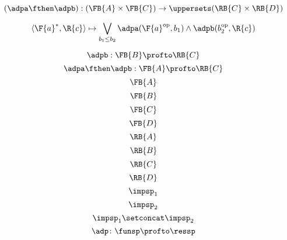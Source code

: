 {\begin{forslides}
        \begin{equation}
            \label{eq:adpM12us}
            (\adpa\fthen\adpb):(\FB{A} \times \FB{C})  \to\uppersets (\RB{C} \times \RB{D})
        \end{equation}

        \begin{equation}
            \label{eq:adp12pfexpr}
            \langle\F{a}^*, \R{c}\rangle \mapsto \bigvee_{b_1\leq b_2} \adpa(\F{a}^{\text{op}}, b_1) \wedge \adpb(b_2^{\text{op}}, \R{c})
        \end{equation}

        \begin{equation}
            \label{eq:adp2}
            \adpb: \FB{B} \profto  \RB{C}
        \end{equation}
        \begin{equation}
            \label{eq:adp1adp2}
            \adpa\fthen\adpb: \FB{A} \profto  \RB{C}
        \end{equation}
        \begin{equation}
            \label{eq:FA}
            \FB{A}
        \end{equation}
        \begin{equation}
            \label{eq:FB}
            \FB{B}
        \end{equation}
        \begin{equation}
            \label{eq:FC}
            \FB{C}
        \end{equation}
        \begin{equation}
            \label{eq:FD}
            \FB{D}
        \end{equation}
        \begin{equation}
            \label{eq:RA}
            \RB{A}
        \end{equation}
        \begin{equation}
            \label{eq:RB}
            \RB{B}
        \end{equation}
        \begin{equation}
            \label{eq:RC}
            \RB{C}
        \end{equation}
        \begin{equation}
            \label{eq:RD}
            \RB{D}
        \end{equation}
        \begin{equation}
            \label{eq:impsp1}
            \impsp_1
        \end{equation}
        \begin{equation}
            \label{eq:impsp2}
            \impsp_2
        \end{equation}
        \begin{equation}
            \label{eq:impsp12}
            \impsp_{1} \setconcat \impsp_{2}
        \end{equation}
        \begin{equation}
            \label{eq:dproba}
            \adp \colon \funsp \profto \ressp
        \end{equation}


\end{forslides}}
